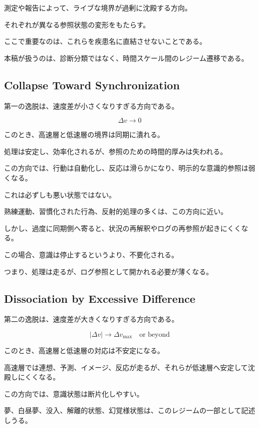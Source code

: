 測定や報告によって、ライブな境界が過剰に沈殿する方向。

それぞれが異なる参照状態の変形をもたらす。

ここで重要なのは、これらを疾患名に直結させないことである。

本稿が扱うのは、診断分類ではなく、時間スケール間のレジーム遷移である。

\subsection{Collapse Toward Synchronization}

第一の逸脱は、速度差が小さくなりすぎる方向である。

\begin{equation}
\Delta v \rightarrow 0
\end{equation}

このとき、高速層と低速層の境界は同期に潰れる。

処理は安定し、効率化されるが、参照のための時間的厚みは失われる。

この方向では、行動は自動化し、反応は滑らかになり、明示的な意識的参照は弱くなる。

これは必ずしも悪い状態ではない。

熟練運動、習慣化された行為、反射的処理の多くは、この方向に近い。

しかし、過度に同期側へ寄ると、状況の再解釈やログの再参照が起きにくくなる。

この場合、意識は停止するというより、不要化される。

つまり、処理は走るが、ログ参照として開かれる必要が薄くなる。

\subsection{Dissociation by Excessive Difference}

第二の逸脱は、速度差が大きくなりすぎる方向である。

\begin{equation}
|\Delta v| \rightarrow \Delta v_{\max}
\quad \text{or beyond}
\end{equation}

このとき、高速層と低速層の対応は不安定になる。

高速層では連想、予測、イメージ、反応が走るが、それらが低速層へ安定して沈殿しにくくなる。

この方向では、意識状態は断片化しやすい。

夢、白昼夢、没入、解離的状態、幻覚様状態は、このレジームの一部として記述しうる。

